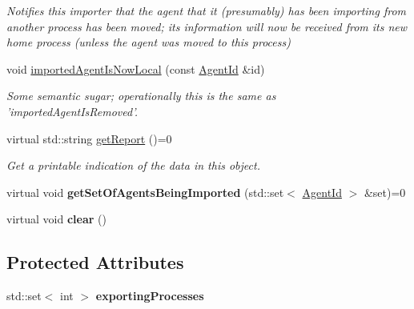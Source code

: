 \begin{DoxyCompactItemize}
\begin{DoxyCompactList}\small\item\em Notifies this importer that the agent that it (presumably) has been importing from another process has been moved; its information will now be received from its new home process (unless the agent was moved to this process) \end{DoxyCompactList}\item 
\hypertarget{classrepast_1_1_abstract_importer_a4797219171a2399745cab0a6e576c353}{void \hyperlink{classrepast_1_1_abstract_importer_a4797219171a2399745cab0a6e576c353}{imported\-Agent\-Is\-Now\-Local} (const \hyperlink{classrepast_1_1_agent_id}{Agent\-Id} \&id)}\label{classrepast_1_1_abstract_importer_a4797219171a2399745cab0a6e576c353}

\begin{DoxyCompactList}\small\item\em Some semantic sugar; operationally this is the same as 'imported\-Agent\-Is\-Removed'. \end{DoxyCompactList}\item 
\hypertarget{classrepast_1_1_abstract_importer_a88f4cf004854b5586832e94346fd6f09}{virtual std\-::string \hyperlink{classrepast_1_1_abstract_importer_a88f4cf004854b5586832e94346fd6f09}{get\-Report} ()=0}\label{classrepast_1_1_abstract_importer_a88f4cf004854b5586832e94346fd6f09}

\begin{DoxyCompactList}\small\item\em Get a printable indication of the data in this object. \end{DoxyCompactList}\item 
\hypertarget{classrepast_1_1_abstract_importer_a108ac85357128d13cab863d8d63c74d4}{virtual void {\bfseries get\-Set\-Of\-Agents\-Being\-Imported} (std\-::set$<$ \hyperlink{classrepast_1_1_agent_id}{Agent\-Id} $>$ \&set)=0}\label{classrepast_1_1_abstract_importer_a108ac85357128d13cab863d8d63c74d4}

\item 
\hypertarget{classrepast_1_1_abstract_importer_ad4effa8810c5bbe3f584d06283293a51}{virtual void {\bfseries clear} ()}\label{classrepast_1_1_abstract_importer_ad4effa8810c5bbe3f584d06283293a51}

\end{DoxyCompactItemize}
\subsection*{Protected Attributes}
\begin{DoxyCompactItemize}
\item 
\hypertarget{classrepast_1_1_abstract_importer_a80a457a09ccb2c2b0ac589d2fdaa4e81}{std\-::set$<$ int $>$ {\bfseries exporting\-Processes}}\label{classrepast_1_1_abstract_importer_a80a457a09ccb2c2b0ac589d2fdaa4e81}

\end{DoxyCompactItemize}


